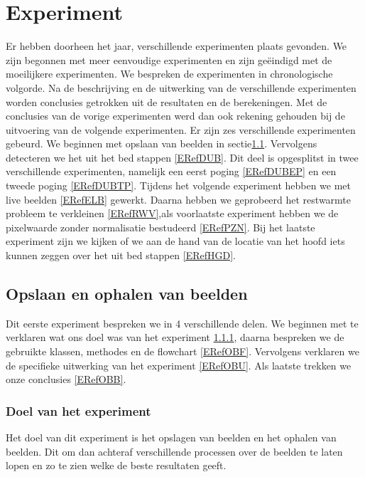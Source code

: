 \chapter{Experiment}
\label{ERef}
Er hebben doorheen het jaar, verschillende experimenten plaats gevonden. We zijn begonnen met meer eenvoudige experimenten en zijn ge\"eindigd met de moeilijkere experimenten. We bespreken de experimenten in chronologische volgorde. Na de beschrijving en de uitwerking van de verschillende experimenten worden conclusies getrokken uit de resultaten en de berekeningen. Met de conclusies van de vorige experimenten werd dan ook rekening gehouden bij de uitvoering van de volgende experimenten. Er zijn zes verschillende experimenten gebeurd. We beginnen met opslaan van beelden in sectie\ref{ERefOvB}. Vervolgens detecteren we het uit het bed stappen \ref{ERefDUB}. Dit deel is opgesplitst in twee verschillende experimenten, namelijk een eerst poging \ref{ERefDUBEP} en een tweede poging \ref{ERefDUBTP}. Tijdens het volgende experiment hebben we met live beelden \ref{ERefELB} gewerkt. Daarna hebben we geprobeerd het restwarmte probleem te verkleinen \ref{ERefRWV},als voorlaatste experiment hebben we de pixelwaarde zonder normalisatie bestudeerd \ref{ERefPZN}. Bij het laatste experiment zijn we kijken of we aan de hand van de locatie van het hoofd iets kunnen zeggen over het uit bed stappen \ref{ERefHGD}.

\section{Opslaan en ophalen van beelden}
\label{ERefOvB}
Dit eerste experiment bespreken we in 4 verschillende delen. We beginnen met te verklaren wat ons doel was van het experiment \ref{ERefOBD}, daarna bespreken we de gebruikte klassen, methodes en de flowchart \ref{ERefOBF}. Vervolgens verklaren we de specifieke uitwerking van het experiment \ref{ERefOBU}. Als laatste trekken we onze conclusies \ref{ERefOBB}.

\subsection{Doel van het experiment}
\label{ERefOBD}
Het doel van dit experiment is het opslagen van beelden en het ophalen van beelden. Dit om dan achteraf verschillende processen over de beelden te laten lopen en zo te zien welke de beste resultaten geeft. 


